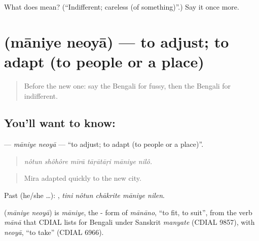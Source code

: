 \begin{tcolorbox}[breakable,colback=teal!4,colframe=teal!35!black,title={Before you move on}]
What does  mean? (\textquotedblleft{}Indifferent; careless (of something)\textquotedblright{}.) Say it once more.
\end{tcolorbox}
\section[\texorpdfstring{\bn{মানিয়ে} \bn{নেওয়া} (māniye neoyā)}{মানিয়ে নেওয়া (māniye neoyā)}]{  (māniye neoyā) — to adjust; to adapt (to people or a place)}

\label{lesson:BN-C464-maniye-neoya}



\begin{quote}
Before the new one: say the Bengali for fussy, then the Bengali for indifferent.
\end{quote}

\subsection*{You'll want to know:  }
\textbf{ } — \emph{māniye neoyā} — \textquotedblleft{}to adjust; to adapt (to people or a place)\textquotedblright{}.

\begin{quote}
     
\end{quote}

\begin{quote}
\emph{nôtun shôhôre mīrā tāṛātāṛi māniye nilô.}
\end{quote}

\begin{quote}
Mira adapted quickly to the new city.
\end{quote}

Past (he/she …):     , \emph{tini nôtun chākrite māniye nilen}.

\begin{cousinweb}
\textbf{ } (\emph{māniye neoyā}) is \emph{māniye}, the - form of \emph{mānāno}, \textquotedblleft{}to fit, to suit\textquotedblright{}, from the verb \emph{mānā} that CDIAL lists for Bengali under Sanskrit \emph{manyate} (CDIAL 9857), with \emph{neoyā}, \textquotedblleft{}to take\textquotedblright{} (CDIAL 6966).
\end{cousinweb}

